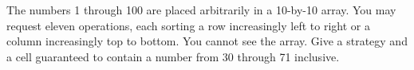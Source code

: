 The numbers 1 through 100 are placed arbitrarily in a 10-by-10 array. You may request eleven operations, each sorting a row increasingly left to right or a column increasingly top to bottom. You cannot see the array. Give a strategy and a cell guaranteed to contain a number from 30 through 71 inclusive.
